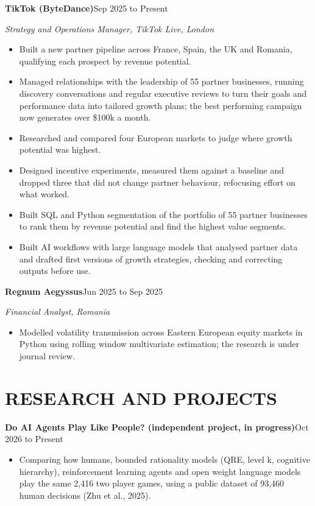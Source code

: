 \documentclass[a4paper,11pt]{article}
\newcommand{\entry}[2]{\vspace{2pt}\noindent\textbf{#1}\hfill #2\par\vspace{1pt}}
\newenvironment{pts}{\begin{itemize}[leftmargin=0.2in,label=\textbullet,topsep=1pt,itemsep=1pt,parsep=0pt]}{\end{itemize}\vspace{-2pt}}
\begin{document}
\entry{TikTok (ByteDance)}{Sep 2025 to Present}
\noindent\textit{Strategy and Operations Manager, TikTok Live, London}
\begin{pts}
  \item Built a new partner pipeline across France, Spain, the UK and Romania, qualifying each prospect by revenue potential.
  \item Managed relationships with the leadership of 55 partner businesses, running discovery conversations and regular executive reviews to turn their goals and performance data into tailored growth
plans; the best performing campaign now generates over \$100k a month.
  \item Researched and compared four European markets to judge where growth potential was highest.
  \item Designed incentive experiments, measured them against a baseline and dropped three that did not change partner behaviour, refocusing effort on what worked.
  \item Built SQL and Python segmentation of the portfolio of 55 partner businesses to rank them by revenue potential and find the highest value segments.
  \item Built AI workflows with large language models that analysed partner data and drafted first versions of growth strategies, checking and correcting outputs before use.
\end{pts}

\entry{Regnum Aegyssus}{Jun 2025 to Sep 2025}
\noindent\textit{Financial Analyst, Romania}
\begin{pts}
  \item Modelled volatility transmission across Eastern European equity markets in Python using rolling window multivariate estimation; the research is under journal review.
\end{pts}

\section{RESEARCH AND PROJECTS}

\entry{Do AI Agents Play Like People? \textmd{(independent project, in progress)}}{Oct 2026 to Present}
\begin{pts}
  \item Comparing how humans, bounded rationality models (QRE, level k, cognitive hierarchy), reinforcement learning agents and open weight language models play the same 2,416 two player games, using
a public dataset of 93,460 human decisions (Zhu et al., 2025).
\end{pts}
\end{document}
